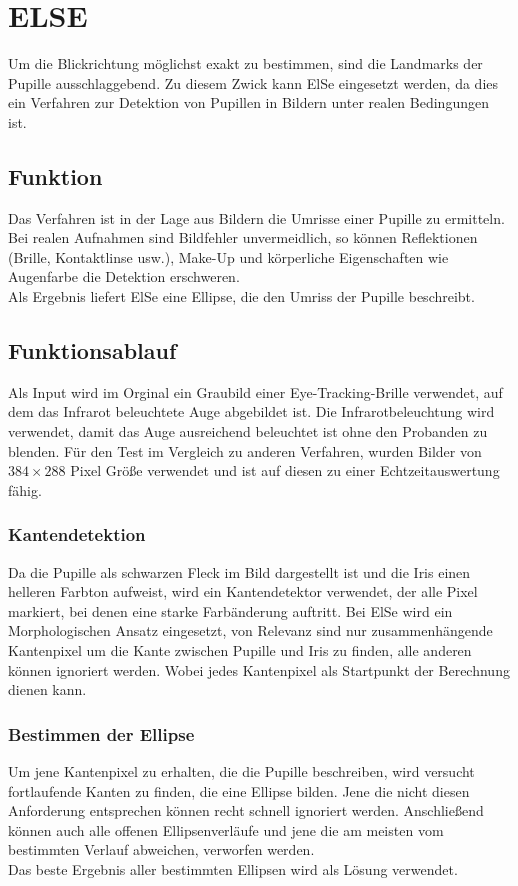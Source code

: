 \section{ELSE}
Um die Blickrichtung möglichst exakt zu bestimmen, sind die Landmarks der Pupille ausschlaggebend. Zu diesem Zwick kann ElSe eingesetzt werden, da dies ein Verfahren zur Detektion von Pupillen in Bildern unter realen Bedingungen ist.
\subsection{Funktion}
Das Verfahren ist in der Lage aus Bildern die Umrisse einer Pupille zu ermitteln. Bei realen Aufnahmen sind Bildfehler unvermeidlich, so können Reflektionen (Brille, Kontaktlinse usw.), Make-Up und körperliche Eigenschaften wie Augenfarbe die Detektion erschweren.\\
Als Ergebnis liefert ElSe eine Ellipse, die den Umriss der Pupille beschreibt.
\subsection{Funktionsablauf}
Als Input wird im Orginal ein Graubild einer Eye-Tracking-Brille verwendet, auf dem das Infrarot beleuchtete Auge abgebildet ist. Die Infrarotbeleuchtung wird verwendet, damit das Auge ausreichend beleuchtet ist ohne den Probanden zu blenden. Für den Test im Vergleich zu anderen Verfahren, wurden Bilder von $384\times 288$ Pixel Größe verwendet und ist auf diesen zu einer Echtzeitauswertung fähig.
\subsubsection{Kantendetektion}
Da die Pupille als schwarzen Fleck im Bild dargestellt ist und die Iris einen helleren Farbton aufweist, wird ein Kantendetektor verwendet, der alle Pixel markiert, bei denen eine starke Farbänderung auftritt. Bei ElSe wird ein Morphologischen Ansatz eingesetzt, von Relevanz sind nur zusammenhängende Kantenpixel um die Kante zwischen Pupille und Iris zu finden, alle anderen können ignoriert werden. Wobei jedes Kantenpixel als Startpunkt der Berechnung dienen kann.
\subsubsection{Bestimmen der Ellipse}
Um jene Kantenpixel zu erhalten, die die Pupille beschreiben, wird versucht fortlaufende Kanten zu finden, die eine Ellipse bilden. Jene die nicht diesen Anforderung entsprechen können recht schnell ignoriert werden. Anschließend können auch alle offenen Ellipsenverläufe und jene die am meisten vom bestimmten Verlauf abweichen, verworfen werden.\\
Das beste Ergebnis aller bestimmten Ellipsen wird als Lösung verwendet.
